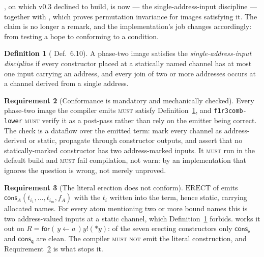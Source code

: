 \documentclass[11pt,a4paper]{article}
\newcommand{\code}[1]{\texttt{#1}}
\newcommand{\MUST}{\textsc{must}}
\newcommand{\MUSTNOT}{\textsc{must not}}
\newcommand{\drp}[1]{{*}#1}
\newcommand{\inp}[3]{\mathsf{for}(\,#1 \leftarrow #2\,)#3}
\newcommand{\out}[2]{#1!(#2)}
\newcommand{\ev}{\mathsf{e}}
\newcommand{\qq}{\mathsf{q}}
\newcommand{\cons}{\mathsf{cons}}
\newcommand{\ERECT}{\mathrm{ERECT}}
\theoremstyle{definition}
\newtheorem{definition}{Definition}[section]
\newtheorem{requirement}[definition]{Requirement}
\theoremstyle{plain}
\begin{document}
\cite[Rem.~6.10]{draft3}, on which v0.3 declined to build, is now
\cite[Def.~6.10]{draft3} --- the single-address-input discipline --- together
with \cite[Lem.~6.11]{draft3}, which proves permutation invariance for images
satisfying it. The claim is no longer a remark, and the implementation's job
changes accordingly: from testing a hope to conforming to a condition.

\begin{definition}[\cite{draft3} Def.~6.10]\label{def:sai}
A phase-two image satisfies the \emph{single-address-input discipline} if
every constructor placed at a statically named channel has at most one input
carrying an address, and every join of two or more addresses occurs at a
channel derived from a single address.
\end{definition}

\begin{requirement}[Conformance is mandatory and mechanically checked]
\label{req:sai}
Every phase-two image the compiler emits \MUST{} satisfy
Definition~\ref{def:sai}, and \code{f1r3comb-lower} \MUST{} verify it as a
post-pass rather than rely on the emitter being correct. The check is a
dataflow over the emitted term: mark every channel as address-derived or
static, propagate through constructor outputs, and assert that no
statically-marked constructor has two address-marked inputs. It \MUST{} run in
the default build and \MUST{} fail compilation, not warn: by
\cite[Rem.~6.12]{draft3} an implementation that ignores the question is wrong,
not merely unproved.
\end{requirement}

\begin{requirement}[The literal erection does not conform]
\label{req:erectviolates}
$\ERECT$ of \cite[Def.~6.8]{draft3} emits
$\cons_{A}(t_{i_{1}},\dots,t_{i_{m}},f_{A})$ with the $t_{i}$ written into the
term, hence static, carrying allocated names. For every atom mentioning two or
more bound names this is two address-valued inputs at a static channel, which
Definition~\ref{def:sai} forbids. \cite[Ex.~6.16]{draft3} works it out on
$R = \inp{y}{a}{\out{y}{\drp{y}}}$: of the seven erecting constructors only
$\cons_{\ev}$ and $\cons_{\qq}$ are clean. The compiler \MUSTNOT{} emit the
literal construction, and Requirement~\ref{req:sai} is what stops it.
\end{requirement}
\end{document}
